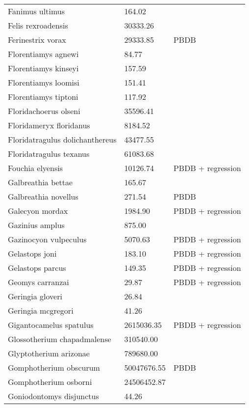 \documentclass{article}
\begin{document}
\begin{center}
\begin{longtable}{p{} p{} p{} }
  Fanimus ultimus & 164.02 & \cite{Tomiya2013} \\ 
  Felis rexroadensis & 30333.26 & \cite{Tomiya2013} \\ 
  Ferinestrix vorax & 29333.85 & PBDB \\ 
  Florentiamys agnewi & 84.77 & \cite{Tomiya2013} \\ 
  Florentiamys kinseyi & 157.59 & \cite{Tomiya2013} \\ 
  Florentiamys loomisi & 151.41 & \cite{Tomiya2013} \\ 
  Florentiamys tiptoni & 117.92 & \cite{Tomiya2013} \\ 
  Floridachoerus olseni & 35596.41 & \cite{Tomiya2013} \\ 
  Floridameryx floridanus & 8184.52 & \cite{Tomiya2013} \\ 
  Floridatragulus dolichanthereus & 43477.55 & \cite{Tomiya2013} \\ 
  Floridatragulus texanus & 61083.68 & \cite{Tomiya2013} \\ 
  Fouchia elyensis & 10126.74 & PBDB + regression \\ 
  Galbreathia bettae & 165.67 & \cite{Tomiya2013} \\ 
  Galbreathia novellus & 271.54 & PBDB \\ 
  Galecyon mordax & 1984.90 & PBDB + regression \\ 
  Gazinius amplus & 875.00 & \cite{Soligo2006} \\ 
  Gazinocyon vulpeculus & 5070.63 & PBDB + regression \\ 
  Gelastops joni & 183.10 & PBDB + regression \\ 
  Gelastops parcus & 149.35 & PBDB + regression \\ 
  Geomys carranzai & 29.87 & PBDB + regression \\ 
  Geringia gloveri & 26.84 & \cite{Tomiya2013} \\ 
  Geringia mcgregori & 41.26 & \cite{Tomiya2013} \\ 
  Gigantocamelus spatulus & 2615036.35 & PBDB + regression \\ 
  Glossotherium chapadmalense & 310540.00 & \cite{McDonald2005} \\ 
  Glyptotherium arizonae & 789680.00 & \cite{McDonald2005} \\ 
  Gomphotherium obscurum & 50047676.55 & PBDB \\ 
  Gomphotherium osborni & 24506452.87 & \cite{Wang2014} \\ 
  Goniodontomys disjunctus & 44.26 & \cite{Tomiya2013} \\ 

\end{longtable}
\end{center}
\end{document}
